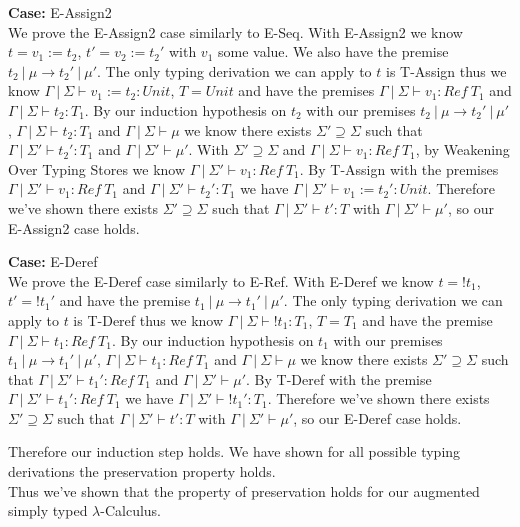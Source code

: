 \documentclass[12pt, fleqn]{article}
\begin{document}
\medskip
\textbf{Case:} E-Assign2\\
We prove the E-Assign2 case similarly to E-Seq. With E-Assign2 we know $t = v_1 := t_2$, $t' = v_2 := t_2'$ with $v_1$ some value. We also have the premise $t_2\:|\:\mu \rightarrow t_2'\:|\:\mu'$. The only typing derivation we can apply to $t$ is T-Assign thus we know $\Gamma\:|\:\Sigma \vdash v_1 := t_2 : Unit$, $T = Unit$ and have the premises $\Gamma\:|\:\Sigma \vdash v_1 : Ref\:T_1$ and $\Gamma\:|\:\Sigma \vdash t_2 : T_1$. 
By our induction hypothesis on $t_2$ with our premises $t_2\:|\:\mu \rightarrow t_2'\:|\:\mu'$, $\Gamma\:|\: \Sigma \vdash t_2 : T_1$ and $\Gamma\:|\:\Sigma \vdash \mu$ we know there exists $\Sigma' \supseteq \Sigma$ such that $\Gamma\:|\:\Sigma' \vdash t_2' : T_1$ and $\Gamma\:|\:\Sigma' \vdash \mu'$.
With $\Sigma' \supseteq \Sigma$ and $\Gamma\:|\:\Sigma \vdash v_1 : Ref\:T_1$, by Weakening Over Typing Stores we know $\Gamma\:|\:\Sigma' \vdash v_1 : Ref\:T_1$. By T-Assign with the premises $\Gamma\:|\:\Sigma' \vdash v_1 : Ref\:T_1$ and $\Gamma\:|\:\Sigma' \vdash t_2' : T_1$ we have $\Gamma\:|\:\Sigma' \vdash v_1 := t_2' : Unit$. Therefore we've shown there exists $\Sigma' \supseteq \Sigma$ such that $\Gamma\:|\:\Sigma' \vdash t' : T$ with $\Gamma\:|\:\Sigma' \vdash \mu'$, so our E-Assign2 case holds.

\medskip
\textbf{Case:} E-Deref\\
We prove the E-Deref case similarly to E-Ref. With E-Deref we know $t = !t_1$, $t' = !t_1'$ and have the premise $t_1\:|\:\mu \rightarrow t_1'\:|\:\mu'$. The only typing derivation we can apply to $t$ is T-Deref thus we know $\Gamma\:|\:\Sigma \vdash !t_1 : T_1$, $T = T_1$ and have the premise $\Gamma\:|\:\Sigma \vdash t_1 : Ref\:T_1$. 
By our induction hypothesis on $t_1$ with our premises $t_1\:|\:\mu \rightarrow t_1'\:|\:\mu'$, $\Gamma\:|\: \Sigma \vdash t_1 : Ref\:T_1$ and $\Gamma\:|\:\Sigma \vdash \mu$ we know there exists $\Sigma' \supseteq \Sigma$ such that $\Gamma\:|\:\Sigma' \vdash t_1' : Ref\:T_1$ and $\Gamma\:|\:\Sigma' \vdash \mu'$. 
By T-Deref with the premise $\Gamma\:|\:\Sigma' \vdash t_1' : Ref\:T_1$ we have $\Gamma\:|\:\Sigma' \vdash !t_1' : T_1$. Therefore we've shown there exists $\Sigma' \supseteq \Sigma$ such that $\Gamma\:|\:\Sigma' \vdash t' : T$ with $\Gamma\:|\:\Sigma' \vdash \mu'$, so our E-Deref case holds.

\medskip
Therefore our induction step holds. We have shown for all possible typing derivations the preservation property holds.\\
Thus we've shown that the property of preservation holds for our augmented simply typed $\lambda$-Calculus.
\end{document}
